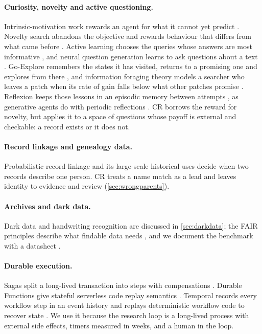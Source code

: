 \paragraph{Curiosity, novelty and active questioning.} Intrinsic-motivation work rewards an agent for what it cannot yet predict \citep{pathak2017curiosity,schmidhuber2010creativity}. Novelty search abandons the objective and rewards behaviour that differs from what came before \citep{lehman2011novelty}. Active learning chooses the queries whose answers are most informative \citep{settles2009active}, and neural question generation learns to ask questions about a text \citep{du2017learning}. Go-Explore remembers the states it has visited, returns to a promising one and explores from there \citep{ecoffet2021goexplore}, and information foraging theory models a searcher who leaves a patch when its rate of gain falls below what other patches promise \citep{pirolli1999foraging}. Reflexion keeps those lessons in an episodic memory between attempts \citep{shinn2023reflexion}, as generative agents do with periodic reflections \citep{park2023generative}. CR borrows the reward for novelty, but applies it to a space of questions whose payoff is external and checkable: a record exists or it does not.

\paragraph{Record linkage and genealogy data.} Probabilistic record linkage \citep{fellegi1969linkage} and its large-scale historical uses \citep{abramitzky2021linking,price2021censustree} decide when two records describe one person. CR treats a name match as a lead and leaves identity to evidence and review (\cref{sec:wrongparents}).

\paragraph{Archives and dark data.} Dark data and handwriting recognition are discussed in \cref{sec:darkdata}; the FAIR principles describe what findable data needs \citep{wilkinson2016fair}, and we document the benchmark with a datasheet \citep{gebru2021datasheets}.

\paragraph{Durable execution.} Sagas split a long-lived transaction into steps with compensations \citep{garciamolina1987sagas}. Durable Functions give stateful serverless code replay semantics \citep{burckhardt2021durable}. Temporal records every workflow step in an event history and replays deterministic workflow code to recover state \citep{temporaldocs,temporalpythonsdk}. We use it because the research loop is a long-lived process with external side effects, timers measured in weeks, and a human in the loop.
